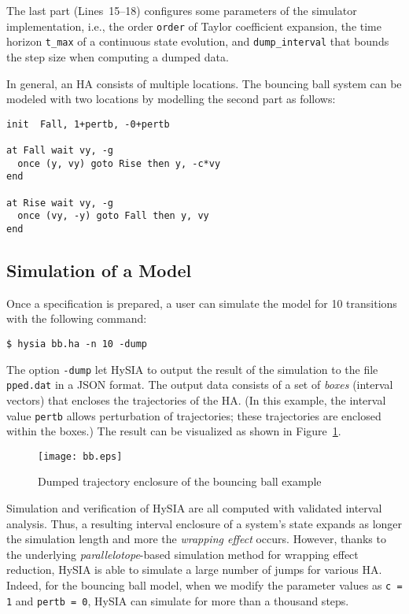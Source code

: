 \documentclass[10pt,a4paper]{article}
\begin{document}
The last part (Lines~15--18) configures some parameters of the simulator implementation, i.e., the order \verb|order| of Taylor coefficient expansion, the time horizon \verb|t_max| of a continuous state evolution, and \verb|dump_interval| that bounds the step size when computing a dumped data.

In general, an HA consists of multiple locations. The bouncing ball system can be modeled with two locations by modelling the second part as follows: %
\begin{lstlisting}
init  Fall, 1+pertb, -0+pertb

at Fall wait vy, -g
  once (y, vy) goto Rise then y, -c*vy
end

at Rise wait vy, -g
  once (vy, -y) goto Fall then y, vy
end
\end{lstlisting}

\subsection{Simulation of a Model}

Once a specification is prepared, a user can simulate the model for 10 transitions with the following command:
\begin{verbatim}
$ hysia bb.ha -n 10 -dump
\end{verbatim}
The option \verb|-dump| let HySIA to output the result of the simulation to the file \verb|pped.dat| in a JSON format.
The output data consists of a set of \emph{boxes} (interval vectors) that encloses the trajectories of the HA.
(In this example, the interval value \verb|pertb| allows perturbation of trajectories; these trajectories are enclosed within the boxes.)
The result can be visualized as shown in Figure~\ref{f:bb}.

\begin{figure}[t]
\centering
\texttt{[image: bb.eps]}
\caption{Dumped trajectory enclosure of the bouncing ball example}
\label{f:bb}
\end{figure}

Simulation and verification of HySIA are all computed with validated interval analysis.
Thus, a resulting interval enclosure of a system's state expands as longer the simulation length and more the \emph{wrapping effect} occurs.
However, thanks to the underlying \emph{parallelotope}-based simulation method for wrapping effect reduction, HySIA is able to simulate a large number of jumps for various HA.
Indeed, for the bouncing ball model, when we modify the parameter values as \verb|c = 1| and \verb|pertb = 0|, HySIA can simulate for more than a thousand steps.
\end{document}
